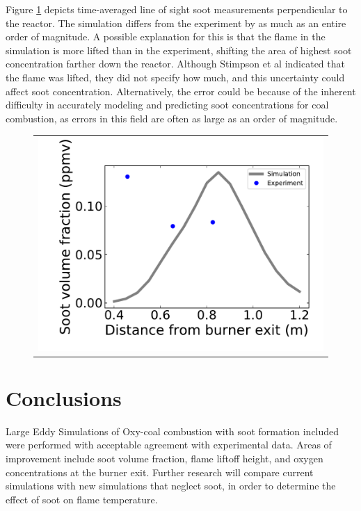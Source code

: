 \documentclass[review,3p]{elsarticle}
\begin{document}
 



Figure \ref{f:fvplot} depicts time-averaged line of sight soot measurements perpendicular to the reactor.  The simulation differs from the experiment by as much as an entire order of magnitude.  A possible explanation for this is that the flame in the simulation is more lifted than in the experiment, shifting the area of highest soot concentration farther down the reactor.  Although Stimpson et al \cite{Stimpson2013} indicated that the flame was lifted, they did not specify how much, and this uncertainty could affect soot concentration.  Alternatively, the error could be because of the inherent difficulty in accurately modeling and predicting soot concentrations for coal combustion, as errors in this field are often as large as an order of magnitude. 

\begin{figure}[!h] 
\begin{center}
\begin{tabular}{c}
\includegraphics[width=4 in]{../figures/fv_plot/fv_plot.pdf}
\end{tabular}
\caption{   }
\label{f:fvplot}
\end{center}
\end{figure}


\section{Conclusions}
%
	Large Eddy Simulations of Oxy-coal combustion with soot formation included were performed with acceptable agreement with experimental data.  Areas of improvement include soot volume fraction, flame liftoff height, and oxygen concentrations at the burner exit.  Further research will compare current simulations with new simulations that neglect soot, in order to determine the effect of soot on flame temperature.
\end{document}
